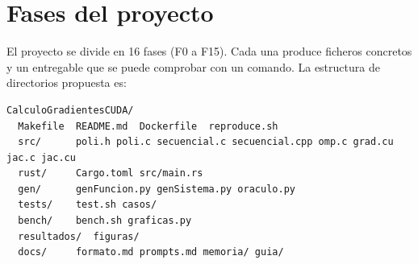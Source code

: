 \setcounter{section}{-1}
\section{Fases del proyecto}\label{sec:fases}

El proyecto se divide en 16 fases (F0 a F15). Cada una produce ficheros concretos y un entregable que se puede comprobar con un comando. La estructura de directorios propuesta es:

\begin{lstlisting}
CalculoGradientesCUDA/
  Makefile  README.md  Dockerfile  reproduce.sh
  src/      poli.h poli.c secuencial.c secuencial.cpp omp.c grad.cu jac.c jac.cu
  rust/     Cargo.toml src/main.rs
  gen/      genFuncion.py genSistema.py oraculo.py
  tests/    test.sh casos/
  bench/    bench.sh graficas.py
  resultados/  figuras/
  docs/     formato.md prompts.md memoria/ guia/
\end{lstlisting}

